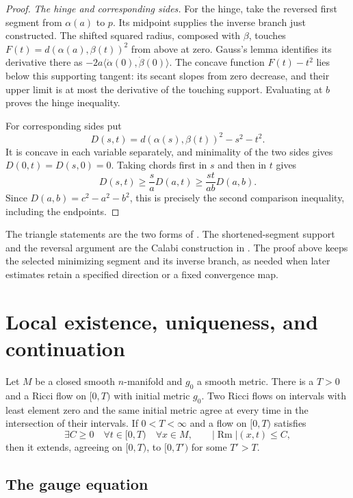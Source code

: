 \begin{proof}
\emph{The hinge and corresponding sides.}
For the hinge, take the reversed first segment from $\alpha(a)$
to $p$.  Its midpoint supplies the inverse branch just
constructed.  The shifted squared radius, composed with
$\beta$, touches
$F(t)=d(\alpha(a),\beta(t))^2$ from above at zero.
Gauss's lemma identifies its derivative there as
$-2a\langle\dot\alpha(0),\dot\beta(0)\rangle$.
The concave function $F(t)-t^2$ lies below this supporting
tangent: its secant slopes from zero decrease, and their
upper limit is at most the derivative of the touching
support.  Evaluating at $b$ proves the hinge inequality.

For corresponding sides put
\[
 D(s,t)=d(\alpha(s),\beta(t))^2-s^2-t^2 .
\]
It is concave in each variable separately, and minimality of
the two sides gives $D(0,t)=D(s,0)=0$.  Taking chords first
in $s$ and then in $t$ gives
\[
 D(s,t)\geq\frac{s}{a}D(a,t)
          \geq\frac{st}{ab}D(a,b).
\]
Since $D(a,b)=c^2-a^2-b^2$, this is precisely the second
comparison inequality, including the endpoints.
\end{proof}

The triangle statements are the two forms of
\cite[Theorem 2.4, p. 23]{MT2007}.  The shortened-segment
support and the reversal argument are the Calabi construction
in \cite[Lemma 7.1.9, pp. 284--285]{Petersen2016}.
The proof above keeps the selected minimizing segment and
its inverse branch, as needed when later estimates retain
a specified direction or a fixed convergence map.

\section{Local existence, uniqueness, and continuation}
\label{sec:rf-local}

\begin{theorem}\label{thm:rf-local}
Let $M$ be a closed smooth $n$-manifold and $g_0$ a smooth metric.
There is a $T>0$ and a Ricci flow on $[0,T)$ with initial metric $g_0$.
Two Ricci flows on intervals with least element zero and the same initial
metric agree at every time in the intersection of their intervals.
If $0<T<\infty$ and a flow on $[0,T)$ satisfies
\[
 \exists C\geq0\quad\forall t\in[0,T)\quad\forall x\in M,\qquad
                       |\operatorname{Rm}|(x,t)\leq C,
\]
then it extends, agreeing on $[0,T)$, to $[0,T')$ for some $T'>T$.
\end{theorem}

\subsection{The gauge equation}

